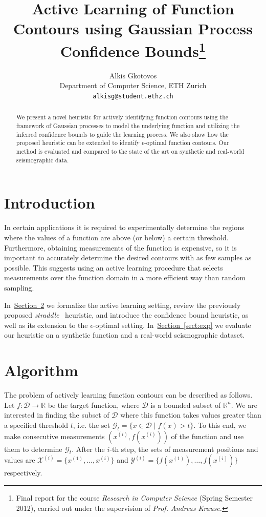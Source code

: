 \documentclass[11pt]{article} %
\title{Active Learning of Function Contours using Gaussian Process Confidence Bounds\thanks{Final
report for the course \emph{Research in Computer Science} (Spring
Semester 2012), carried out under the supervision of \emph{Prof. Andreas Krause.}}}
\author{
Alkis Gkotovos\\
Department of Computer Science, ETH Zurich\\
\texttt{alkisg@student.ethz.ch}
}
\newcommand{\sectref}[1]{\hyperref[#1]{\mbox{Section~\ref*{#1}}}}
\begin{document}
\maketitle

\begin{abstract}
We present a novel heuristic for actively identifying function
contours using the framework of Gaussian processes to model the underlying
function and utilizing the
inferred confidence bounds to guide the learning process. We also show how
the proposed heuristic can be extended to identify $\epsilon$-optimal function
contours. Our method is evaluated and compared to the state of the art on
synthetic and real-world seismographic data.
\end{abstract}

\section{Introduction}
In certain applications it is required to experimentally determine the regions
where the values of a function are above (or below) a certain threshold.
Furthermore, obtaining measurements of the function is expensive, so it is
important to
accurately determine the desired contours with as few samples as possible.
This suggests using an active learning procedure that selects measurements
over the function domain in a more efficient way than random sampling.

In~\sectref{sect:algo} we formalize the active learning setting,
review the previously proposed \emph{straddle}~\cite{bryan2005} heuristic,
and introduce the confidence bound heuristic, as well as its extension
to the $\epsilon$-optimal setting. In~\sectref{sect:exp} we
evaluate our heuristic on a synthetic function and a real-world seismographic
dataset.

\section{Algorithm} \label{sect:algo}
The problem of actively learning function contours can be described as follows.
Let ${f : \mathcal{D} \to \mathbb{R}}$ be the target function, where
$\mathcal{D}$ is a bounded subset of $\mathbb{R}^n$. We are interested in
finding the subset of $\mathcal{D}$ where this function takes values greater
than a specified threshold $t$, i.e. the set
$\mathcal{G}_t = \{x \in \mathcal{D} \mid f(x) > t\}$. To this end, we make
consecutive measurements $(x^{(i)}, f(x^{(i)}))$ of the function
and use them to determine $\mathcal{G}_t$. After the $i$-th step, the sets of
measurement positions and values are
$\mathcal{X}^{(i)} = \{x^{(1)},\ldots,x^{(i)}\}$ and
$\mathcal{Y}^{(i)} = \{f(x^{(1)}),\ldots,f(x^{(i)})\}$ respectively.
\end{document}

